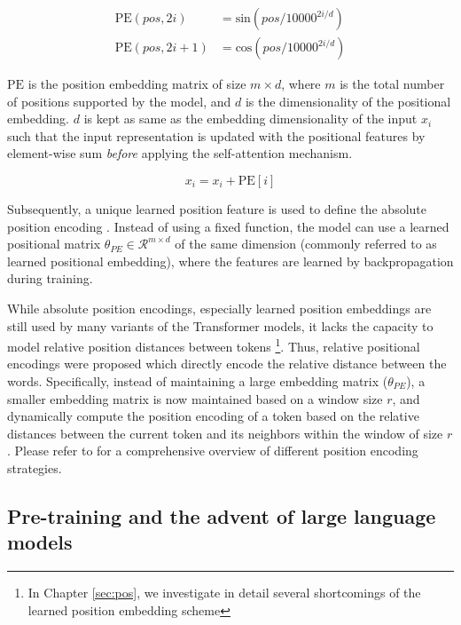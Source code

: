 \documentclass[letterpaper, 12pt]{report}
\begin{document}
\begin{equation}
  \begin{aligned}
	\text{PE}(pos, 2i) &= \text{sin}(pos / 10000^{2i / d}) \\
    \text{PE}(pos, 2i+1) &= \text{cos}(pos / 10000^{2i / d})
  \end{aligned}
\end{equation}

\noindent $\text{PE}$ is the position embedding matrix of size $m \times d$, where $m$ is the total number of positions supported by the model, and $d$ is the dimensionality of the positional embedding. $d$ is kept as same as the embedding dimensionality of the input $x_{i}$ such that the input representation is updated with the positional features by element-wise sum \textit{before} applying the self-attention mechanism.

\begin{equation}
  x_{i} = x_{i} + \text{PE}[i]
\end{equation}

Subsequently, a unique learned position feature is used to define the absolute position encoding \citep{devlin2018bert}. Instead of using a fixed function, the model can use a learned positional matrix $\theta_{PE} \in \mathcal{R}^{m \times d}$ of the same dimension (commonly referred to as learned positional embedding), where the features are learned by backpropagation during training.

While absolute position encodings, especially learned position embeddings are still used by many variants of the Transformer models, it lacks the capacity to model relative position distances between tokens \footnote{In Chapter \ref{sec:pos}, we investigate in detail several shortcomings of the learned position embedding scheme}. Thus, relative positional encodings were proposed \citep{shaw-etal-2018-self} which directly encode the relative distance between the words. Specifically, instead of maintaining a large embedding matrix ($\theta_{PE}$), a smaller embedding matrix is now maintained based on a window size $r$, and dynamically compute the position encoding of a token based on the relative distances between the current token and its neighbors within the window of size $r$.
Please refer to \citet{wang2021on,dufter2021position} for a comprehensive overview of different position encoding strategies.

\subsection{Pre-training and the advent of large language models}
\label{sec:bg_pretraining}
\end{document}
